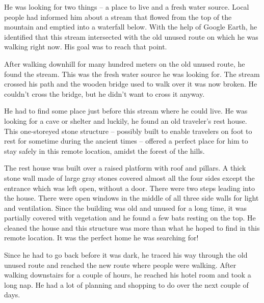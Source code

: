 He was looking for two things – a place to live and a fresh water source. Local
people had informed him about a stream that flowed from the top of the mountain
and emptied into a waterfall below. With the help of Google Earth, he identified
that this stream intersected with the old unused route on which he was walking
right now. His goal was to reach that point.

After walking downhill for many hundred meters on the old unused route, he found
the stream. This was the fresh water source he was looking for. The stream
crossed his path and the wooden bridge used to walk over it was now broken. He
couldn't cross the bridge, but he didn't want to cross it anyway.

He had to find some place just before this stream where he could live. He was
looking for a cave or shelter and luckily, he found an old traveler's rest
house. This one-storeyed stone structure – possibly built to enable travelers on
foot to rest for sometime during the ancient times – offered a perfect place for
him to stay safely in this remote location, amidst the forest of the hills.

The rest house was built over a raised platform with roof and pillars. A thick
stone wall made of large gray stones covered almost all the four sides except
the entrance which was left open, without a door. There were two steps leading
into the house. There were open windows in the middle of all three side walls
for light and ventilation. Since the building was old and unused for a long
time, it was partially covered with vegetation and he found a few bats resting
on the top. He cleaned the house and this structure was more than what he hoped
to find in this remote location. It was the perfect home he was searching for!

Since he had to go back before it was dark, he traced his way through the old
unused route and reached the new route where people were walking. After walking
downstairs for a couple of hours, he reached his hotel room and took a long nap.
He had a lot of planning and shopping to do over the next couple of days.